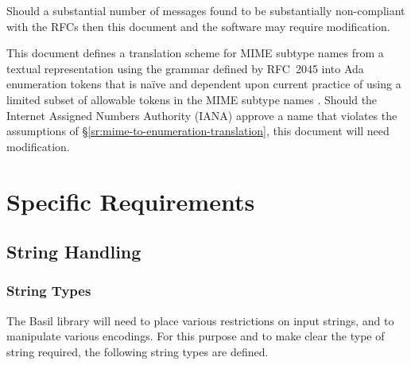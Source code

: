 \documentclass[11pt]{article}
\begin{document}
Should a substantial number of messages found to be substantially
non-compliant with the RFCs then this document and the software may
require modification.

This document defines a translation scheme for MIME subtype names from
a textual representation using the grammar defined by RFC~2045 into
Ada enumeration tokens that is na\"{i}ve and dependent upon current
practice of using a limited subset of allowable tokens in the MIME
subtype names . Should the
Internet Assigned Numbers Authority (IANA) approve a name that
violates the assumptions of
\S\ref{sr:mime-to-enumeration-translation}, this document will need
modification.


\section{Specific Requirements}
\label{specific-requirements}



\subsection{String Handling}
\label{sr:strings}

\subsubsection{String Types}

The Basil library will need to place various restrictions on input
strings, and to manipulate various encodings. For this purpose and to
make clear the type of string required, the following string types
are defined.
\end{document}
